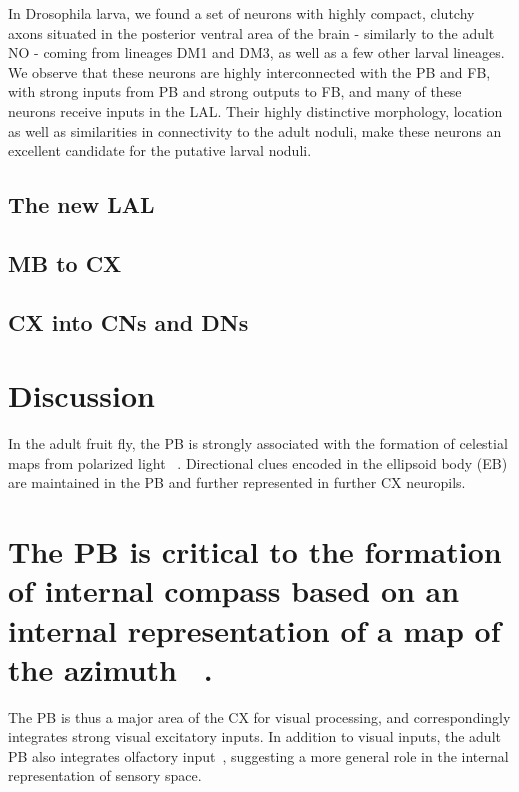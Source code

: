 \documentclass{article}
\begin{document}
In Drosophila larva, we found a set of neurons with highly compact, clutchy axons situated in the posterior ventral area of the brain - similarly to the adult NO - coming from lineages DM1 and DM3, as well as a few other larval lineages. We observe that these neurons are highly interconnected with the PB and FB,  with strong inputs from 
PB and strong outputs to FB, and many of these neurons receive inputs in the LAL.
Their highly distinctive morphology, location as well as similarities in connectivity to the adult noduli, make these neurons an excellent candidate for the putative larval noduli.






\subsection{The new LAL}
\subsection{MB to CX}
\subsection{CX into CNs and DNs}




\section{Discussion}


In the adult fruit fly, the PB is strongly associated with the formation of celestial maps from polarized light ~\citep{heinze2009transformation, lin2013comprehensive}.
Directional clues encoded in the ellipsoid body (EB) are maintained in the PB and further represented in further CX neuropils.
\section{The PB is critical to the formation of internal compass based on an internal representation of a map of the azimuth ~\citep{heinze2017unraveling}.}
The PB is thus a major area of the CX for visual processing, and correspondingly integrates strong visual excitatory inputs.
In addition to visual inputs, the adult PB also integrates olfactory input~\citep{MISSING}, suggesting a more general role in the internal representation of sensory space.
\end{document}
